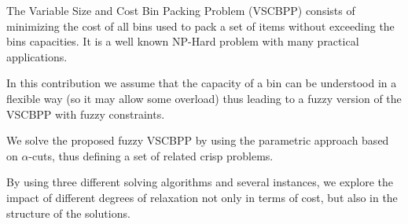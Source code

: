 
The Variable Size and Cost Bin Packing Problem (VSCBPP) consists of minimizing the cost of all bins used to pack a set of items without exceeding the bins capacities.
It is a well known NP-Hard problem with many practical applications.

In this contribution we assume that the capacity of a bin can be understood in a flexible way (so it may allow some overload) thus leading to a fuzzy version of the VSCBPP with fuzzy constraints.


We solve the proposed fuzzy VSCBPP by using the parametric approach based on $\alpha$-cuts, thus defining a set of related crisp problems.

By using three different solving algorithms and several instances, we explore the impact of different degrees of relaxation not only in terms of cost, but also in the structure of the solutions.



